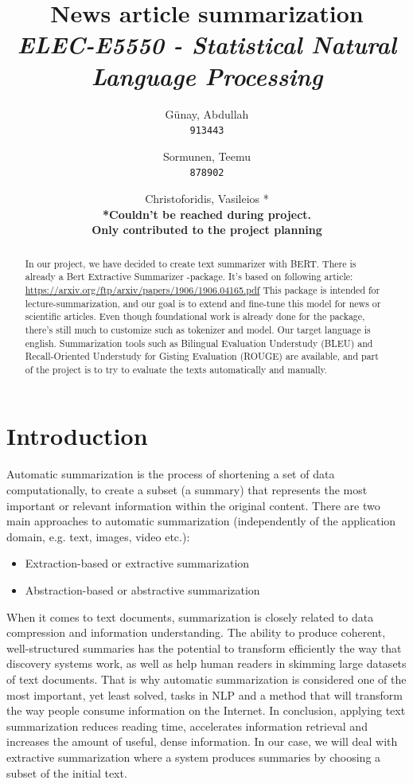 \documentclass{article}
\title{\textbf{News article summarization}\\
\textit{ELEC-E5550 - Statistical Natural Language Processing}}
\author{
  Günay, Abdullah\\
  \texttt{913443}
  \and
  Sormunen, Teemu\\
  \texttt{878902}
  \and
  Christoforidis, Vasileios *\\
  \textbf{*Couldn't be reached during project.\\ Only contributed to the project planning}
}
\begin{document}
	
\maketitle

\begin{abstract}
	\noindent
	In our project, we have decided to create text summarizer with BERT. 
	There is already a Bert Extractive Summarizer -package. It's based on following article: \href{https://arxiv.org/ftp/arxiv/papers/1906/1906.04165.pdf}{https://arxiv.org/ftp/arxiv/papers/1906/1906.04165.pdf}
	This package is intended for lecture-summarization, and our goal is to extend and fine-tune this model for news or scientific articles.
	Even though foundational work is already done for the package, there's still much to customize such as tokenizer and model. 
	Our target language is english. Summarization tools such as Bilingual Evaluation Understudy (BLEU) and Recall-Oriented Understudy for Gisting Evaluation (ROUGE) are available, and part of the project is to try to evaluate the texts automatically and manually.	
\end{abstract}

\clearpage
\section{Introduction}

Automatic summarization is the process of shortening a set of data computationally, to create a subset (a summary) that represents the most important or relevant information within the original content. There are two main approaches to automatic summarization (independently of the application domain, e.g. text, images, video etc.):
\begin{itemize}
	\item Extraction-based or extractive summarization 
	\item Abstraction-based or abstractive summarization
\end{itemize}

When it comes to text documents, summarization is closely related to data compression and information understanding. The ability to produce coherent, well-structured summaries has the potential to transform efficiently the way that discovery systems work, as well as help human readers in skimming large datasets of text documents. That is why automatic summarization is considered one of the most important, yet least solved, tasks in NLP and a method that will transform the way people consume information on the Internet. In conclusion, applying text summarization reduces reading time, accelerates information retrieval and increases the amount of useful, dense information. In our case, we will deal with extractive summarization where a system produces summaries by choosing a subset of the initial text.
\end{document}
